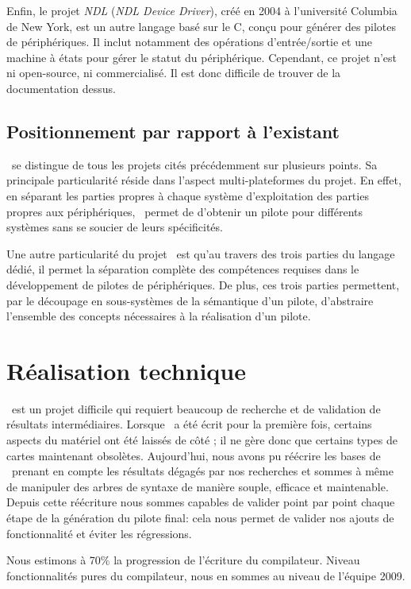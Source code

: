 \documentclass[francais]{rtxreport}
\begin{document}
Enfin, le projet \emph{NDL} (\emph{NDL Device Driver}), créé en 2004 à
l'université Columbia de New York, est un autre langage basé sur le C, conçu
pour générer des pilotes de périphériques. Il inclut notamment des opérations
d'entrée/sortie et une machine à états pour gérer le statut du
périphérique. Cependant, ce projet n'est ni open-source, ni commercialisé. Il
est donc difficile de trouver de la documentation dessus.

\section{Positionnement par rapport à l'existant}
\rtx\ se distingue de tous les projets cités précédemment sur plusieurs
points. Sa principale particularité réside dans l'aspect multi-plateformes du
projet. En effet, en séparant les parties propres à chaque système
d'exploitation des parties propres aux périphériques, \rtx\ permet de d'obtenir
un pilote pour différents systèmes sans se soucier de leurs spécificités.

Une autre particularité du projet \rtx\ est qu'au travers des trois parties du
langage dédié, il permet la séparation complète des compétences requises dans le
développement de pilotes de périphériques. De plus, ces trois parties
permettent, par le découpage en sous-systèmes de la sémantique d'un pilote,
d'abstraire l'ensemble des concepts nécessaires à la réalisation d'un pilote.

\chapter{Réalisation technique}

\rtx\ est un projet difficile qui requiert beaucoup de recherche et de
validation de résultats intermédiaires. Lorsque \rtx\ a été écrit pour la
première fois, certains aspects du matériel ont été laissés de côté ; il ne gère
donc que certains types de cartes maintenant obsolètes. Aujourd'hui, nous avons
pu réécrire les bases de \rtx\ prenant en compte les résultats dégagés par nos
recherches et sommes à même de manipuler des arbres de syntaxe de manière
souple, efficace et maintenable. Depuis cette réécriture nous sommes capables de
valider point par point chaque étape de la génération du pilote final: cela nous
permet de valider nos ajouts de fonctionnalité et éviter les régressions.

Nous estimons à 70\% la progression de l’écriture du compilateur. Niveau
fonctionnalités pures du compilateur, nous en sommes au niveau de l'équipe 2009.
\end{document}
